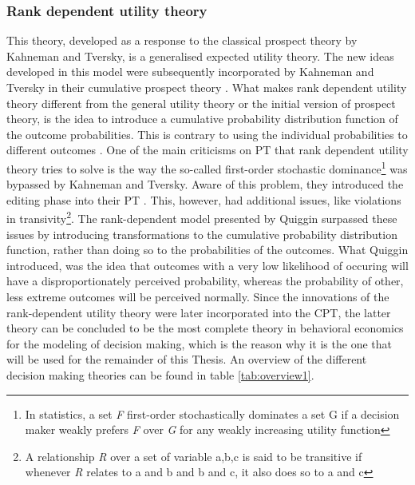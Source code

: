 \subsubsection{Rank dependent utility theory}
This theory, developed as a response to the classical prospect theory by Kahneman and Tversky, is a generalised expected utility theory. The new ideas developed in this model were subsequently incorporated by Kahneman and Tversky in their cumulative prospect theory \cite{prospect2}. What makes rank dependent utility theory different from the general utility theory or the initial version of prospect theory, is the idea to introduce a cumulative probability distribution function of the outcome probabilities. This is contrary to using the individual probabilities to different outcomes \cite{rankdependent}. One of the main criticisms on PT that rank dependent utility theory tries to solve is the way the so-called first-order stochastic dominance\footnote{In statistics, a set \textit{F} first-order stochastically dominates a set G if a decision maker weakly prefers \textit{F} over \textit{G} for any weakly increasing utility function} was bypassed by Kahneman and Tversky. Aware of this problem, they introduced the editing phase into their PT \cite{prospect1}. This, however, had additional issues, like violations in transivity\footnote{A relationship \textit{R} over a set of variable {a,b,c} is said to be transitive if whenever \textit{R} relates to a and b and b and c, it also does so to a and c}.
\newline \newline \noindent
The rank-dependent model presented by Quiggin surpassed these issues by introducing transformations to the cumulative probability distribution function, rather than doing so to the probabilities of the outcomes. What Quiggin introduced, was the idea that outcomes with a very low likelihood of occuring will have a disproportionately perceived probability, whereas the probability of other, less extreme outcomes will be perceived normally. Since the innovations of the rank-dependent utility theory were later incorporated into the CPT, the latter theory can be concluded to be the most complete theory in behavioral economics for the modeling of decision making, which is the reason why it is the one that will be used for the remainder of this Thesis. 
\newline \newline \noindent
An overview of the different decision making theories can be found in table \ref{tab:overview1}.
